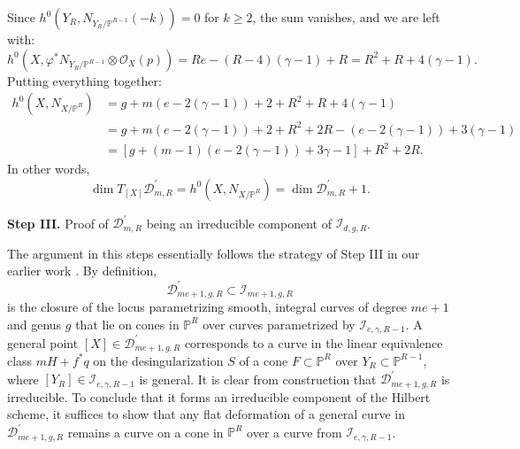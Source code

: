 \documentclass[a4paper,12pt]{amsart}
\def\dim{\operatorname{dim}}
\begin{document}
Since $h^0 (Y_R, N_{Y_R / \mathbb{P}^{R-1}}(-k)) = 0$ for $k \geq 2$, the sum vanishes, and we are left with:
\[
 h^0 (X, \varphi^{\ast} N_{Y_R / \mathbb{P}^{R-1}} \otimes \mathcal{O}_X (p)) = Re - (R-4)(\gamma - 1) + R = R^2 + R + 4(\gamma-1) .
\]
Putting everything together:
\[
 \begin{aligned}
  h^0 (X, N_{X / \mathbb{P}^R}) & =  g + m (e - 2(\gamma - 1)) + 2 + R^2 + R + 4(\gamma-1) \\
  & = g + m (e - 2(\gamma - 1)) + 2 + R^2+2R - (e-2(\gamma-1)) + 3(\gamma-1) \\
  & = \left[ g + (m-1)(e - 2(\gamma-1)) + 3\gamma-1 \right] + R^2+2R .
 \end{aligned}
\]
In other words,
\[
 \dim T_{[X]} \mathcal{D}^{\prime}_{m,R} = h^0 (X, N_{X / \mathbb{P}^R}) = \dim \mathcal{D}^{\prime}_{m,R} + 1 .
\]


\medskip

{\bf Step III.} Proof of $\mathcal{D}^{\prime}_{m,R}$ being an irreducible component of $\mathcal{I}_{d, g, R}$.

The argument in this steps essentially follows the strategy of {\rm Step III} in our earlier work \cite{CIK24b}. By definition,
\[
 \mathcal{D}^{\prime}_{me+1,g,R} \subset \mathcal{I}_{me+1,g,R}
\]
is the closure of the locus parametrizing smooth, integral curves of degree $me+1$ and genus $g$ that lie on cones in $\mathbb{P}^{R}$ over curves parametrized by $\mathcal{I}_{e, \gamma, R-1}$. A general point $[X] \in \mathcal{D}^{\prime}_{me+1,g,R}$ corresponds to a curve in the linear equivalence class $mH + f^{\ast}q$ on the desingularization $S$ of a cone $F \subset \mathbb{P}^R$ over $Y_R \subset \mathbb{P}^{R-1}$, where $[Y_R] \in \mathcal{I}_{e, \gamma, R-1}$ is general. It is clear from construction that  $\mathcal{D}^{\prime}_{me+1,g,R}$ is irreducible. To conclude that it forms an irreducible component of the Hilbert scheme, it suffices to show that any flat deformation of a general curve in $\mathcal{D}^{\prime}_{me+1,g,R}$ remains a curve on a cone in $\mathbb{P}^R$ over a curve from $\mathcal{I}_{e, \gamma, R-1}$.
\end{document}
